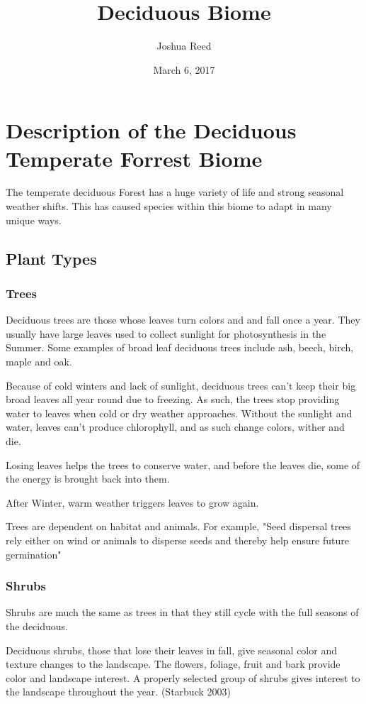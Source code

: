 \documentclass[paper=a4, fontsize=11pt]{article}
\title{Deciduous Biome}
\author{Joshua Reed}
\date{March 6, 2017}
\begin{document}
\maketitle
\section{Description of the Deciduous Temperate Forrest Biome}

The temperate deciduous Forest has a huge variety of life and strong seasonal weather shifts.
This has caused species within this biome to adapt in many unique ways.

\subsection{Plant Types}

\subsubsection{Trees}
Deciduous trees are those whose leaves turn colors and and fall once a year. They usually have
large leaves used to collect sunlight for photosynthesis in the Summer.
Some examples of broad leaf deciduous trees include ash, beech, birch, maple and oak. 

Because of cold winters and lack of sunlight, deciduous trees can't keep their big broad 
leaves all year round due to freezing. As such, the trees stop providing water to leaves when
cold or dry weather approaches. Without the sunlight and water, leaves can't produce chlorophyll, 
and as such change colors, wither and die. 

Losing leaves helps the trees to conserve water, and before the leaves die, some of the energy is
brought back into them.

After Winter, warm weather triggers leaves to grow again.

Trees are dependent on habitat and animals. For example, "Seed dispersal trees rely 
either on wind or animals to disperse seeds and thereby help ensure future 
germination" \cite{dec_eco}

\subsubsection{Shrubs}
Shrubs are much the same as trees in that they still cycle with the full seasons of the deciduous.

Deciduous shrubs, those that lose their leaves in fall, give seasonal color and 
texture changes to the landscape. The flowers, foliage, fruit and bark provide color and landscape interest. 
A properly selected group of shrubs gives interest to the landscape throughout the year. (Starbuck 2003)
\end{document}

